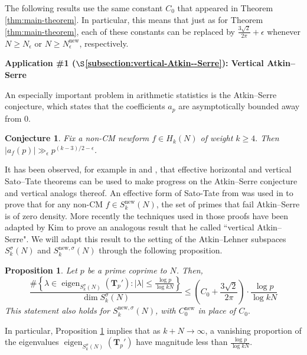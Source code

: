 \documentclass[11pt,letterpaper,reqno]{amsart}
\newtheorem{proposition}[theorem]{Proposition}
\newtheorem{conjecture}[theorem]{Conjecture}
\theoremstyle{definition}
\numberwithin{equation}{section}
\numberwithin{figure}{section}
\numberwithin{table}{section}
\newcommand{\nw}{\mathrm{new}}
\begin{document}
The following results use the same constant $C_0$ that appeared in Theorem \ref{thm:main-theorem}. In particular, this means that just as for Theorem \ref{thm:main-theorem}, each of these constants can be replaced by $\frac{3\sqrt 2}{2\pi} + \epsilon$ whenever $N \geq N_\epsilon$ or $N \geq N^{\nw}_\epsilon$, respectively.


\vspace{4mm}
\textbf{Application \#1 ($\S$\ref{subsection:vertical-Atkin--Serre}): Vertical Atkin--Serre}

An especially important problem in arithmetic statistics is the Atkin--Serre conjecture, which states that the coefficients $a_p$ are asymptotically bounded away from $0$.

{
\renewcommand{\thetheorem}{(Atkin--Serre)}
\begin{conjecture}
    Fix a non-CM newform $f \in H_k (N)$ of weight $k \geq 4.$ Then
    $\left| a_f(p) \right| \gg_\epsilon p^{(k - 3)/2 - \epsilon}$.
\end{conjecture}
\addtocounter{theorem}{-1}
}

It has been observed, for example in \cite{GTW21} and \cite{Kim24}, that effective horizontal and vertical Sato--Tate theorems can be used to make progress on the Atkin--Serre conjecture and vertical analogs thereof. An effective form of Sato-Tate from \cite{Tho21} was used in \cite{GTW21} to prove that for any non-CM $f \in S_k^\nw(N)$, the set of primes that fail Atkin--Serre is of zero density. More recently the techniques used in those proofs have been adapted by Kim \cite{Kim24} to prove an analogous result that he called ``vertical Atkin--Serre".  We will adapt this result to the setting of the Atkin--Lehner subspaces $S_k^\sigma(N)$ and $S_k^{\nw, \sigma}(N)$ through the following proposition.

\begin{proposition}\label{prop:vertical-Atkin--Serre}
    Let $p$ be a prime coprime to $N$. Then,
    $$\frac{\#\left\{ \lambda \in \operatorname{eigen}_{S_k^\sigma(N)} \! \left( \mathbf{T}_{p}'  \right) : \left| \lambda \right| \leq \frac{\log p}{\log kN} \right\}}{\dim S_k^\sigma(N)} \leq \left(C_0 + \frac{3\sqrt{2}}{2\pi} \right) \cdot  \frac{\log p}{\log  kN}$$
    This statement also holds for $S_k^{\nw,\sigma}(N)$, with $C_0^\nw$ in place of $C_0.$
\end{proposition}

In particular, Proposition \ref{prop:vertical-Atkin--Serre} implies that as $k + N \rightarrow \infty$, a vanishing proportion of the eigenvalues $\operatorname{eigen}_{S_k^\sigma(N)} \! \left( \mathbf{T}_{p}'  \right)$ have magnitude less than $\frac{\log p}{\log kN}$.
\end{document}
